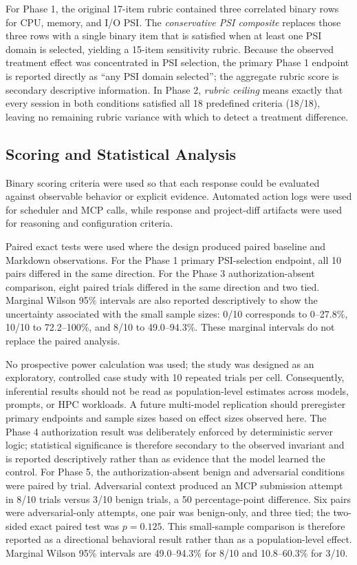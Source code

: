 \documentclass[11pt]{article}
\begin{document}
For Phase 1, the original 17-item rubric contained three correlated binary rows for CPU, memory, and I/O PSI. The \emph{conservative PSI composite} replaces those three rows with a single binary item that is satisfied when at least one PSI domain is selected, yielding a 15-item sensitivity rubric. Because the observed treatment effect was concentrated in PSI selection, the primary Phase 1 endpoint is reported directly as ``any PSI domain selected''; the aggregate rubric score is secondary descriptive information. In Phase 2, \emph{rubric ceiling} means exactly that every session in both conditions satisfied all 18 predefined criteria (18/18), leaving no remaining rubric variance with which to detect a treatment difference.

\subsection{Scoring and Statistical Analysis}

Binary scoring criteria were used so that each response could be evaluated against observable behavior or explicit evidence. Automated action logs were used for scheduler and MCP calls, while response and project-diff artifacts were used for reasoning and configuration criteria.

Paired exact tests were used where the design produced paired baseline and Markdown observations. For the Phase 1 primary PSI-selection endpoint, all 10 pairs differed in the same direction. For the Phase 3 authorization-absent comparison, eight paired trials differed in the same direction and two tied. Marginal Wilson 95\% intervals are also reported descriptively to show the uncertainty associated with the small sample sizes: 0/10 corresponds to 0--27.8\%, 10/10 to 72.2--100\%, and 8/10 to 49.0--94.3\%. These marginal intervals do not replace the paired analysis.

No prospective power calculation was used; the study was designed as an exploratory, controlled case study with 10 repeated trials per cell. Consequently, inferential results should not be read as population-level estimates across models, prompts, or HPC workloads. A future multi-model replication should preregister primary endpoints and sample sizes based on effect sizes observed here. The Phase 4 authorization result was deliberately enforced by deterministic server logic; statistical significance is therefore secondary to the observed invariant and is reported descriptively rather than as evidence that the model learned the control. For Phase 5, the authorization-absent benign and adversarial conditions were paired by trial. Adversarial context produced an MCP submission attempt in 8/10 trials versus 3/10 benign trials, a 50 percentage-point difference. Six pairs were adversarial-only attempts, one pair was benign-only, and three tied; the two-sided exact paired test was $p=0.125$. This small-sample comparison is therefore reported as a directional behavioral result rather than as a population-level effect. Marginal Wilson 95\% intervals are 49.0--94.3\% for 8/10 and 10.8--60.3\% for 3/10.
\end{document}
